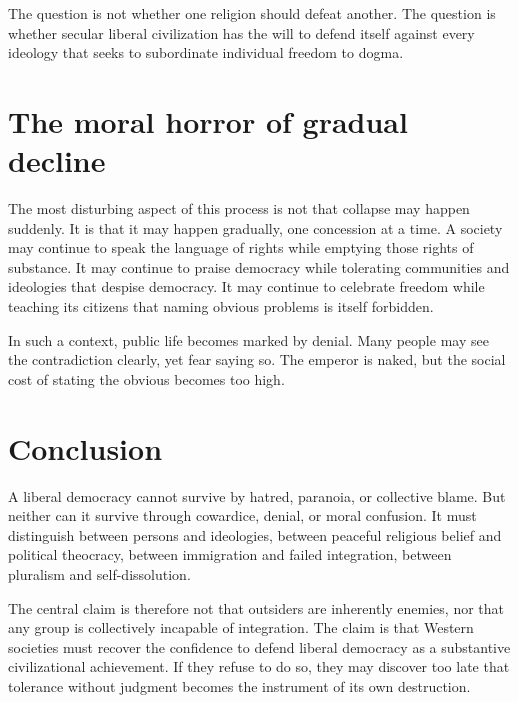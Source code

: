 The question is not whether one religion should defeat another. The question is whether secular liberal civilization has the will to defend itself against every ideology that seeks to subordinate individual freedom to dogma.

\section{The moral horror of gradual decline}

The most disturbing aspect of this process is not that collapse may happen suddenly. It is that it may happen gradually, one concession at a time. A society may continue to speak the language of rights while emptying those rights of substance. It may continue to praise democracy while tolerating communities and ideologies that despise democracy. It may continue to celebrate freedom while teaching its citizens that naming obvious problems is itself forbidden.

In such a context, public life becomes marked by denial. Many people may see the contradiction clearly, yet fear saying so. The emperor is naked, but the social cost of stating the obvious becomes too high.

\section{Conclusion}

A liberal democracy cannot survive by hatred, paranoia, or collective blame. But neither can it survive through cowardice, denial, or moral confusion. It must distinguish between persons and ideologies, between peaceful religious belief and political theocracy, between immigration and failed integration, between pluralism and self-dissolution.

The central claim is therefore not that outsiders are inherently enemies, nor that any group is collectively incapable of integration. The claim is that Western societies must recover the confidence to defend liberal democracy as a substantive civilizational achievement. If they refuse to do so, they may discover too late that tolerance without judgment becomes the instrument of its own destruction.

\endgroup
